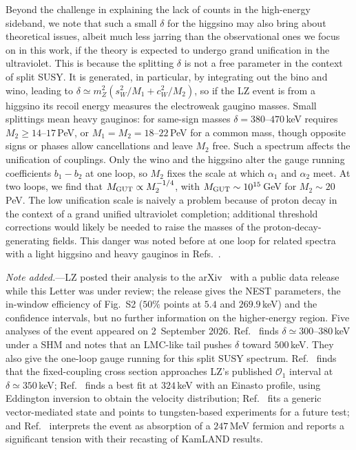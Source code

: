 \documentclass[reprint,superscriptaddress,preprintnumbers,amsmath,amssymb,aps,prd,tightenlines,longbibliography,nofootinbib]{revtex4-2}
\begin{document}
Beyond the challenge in explaining the lack of counts in the high-energy sideband, we note that such a small $\delta$ for the higgsino may also bring about theoretical issues, albeit much less jarring than the observational ones we focus on in this work, if the theory is expected to undergo grand unification in the ultraviolet. This is because the splitting $\delta$ is not a free parameter in the context of split SUSY. It is generated, in particular, by integrating out the bino and wino, leading to $\delta\simeq m_Z^2(s_W^2/M_1+c_W^2/M_2)$, so if the LZ event is from a higgsino its recoil energy measures the electroweak gaugino masses. Small splittings mean heavy gauginos: for same-sign masses $\delta=380$--$470$\,keV requires $M_2\geq14$--$17$\,PeV, or $M_1=M_2=18$--$22$\,PeV for a common mass, though opposite signs or phases allow cancellations and leave $M_2$ free. Such a spectrum affects the unification of couplings. Only the wino and the higgsino alter the gauge running coefficients $b_1-b_2$ at one loop, so $M_2$ fixes the scale at which $\alpha_1$ and $\alpha_2$ meet. At two loops, we find that $M_{\rm GUT} \propto M_2^{-1/4}$, with $M_{\rm GUT} \sim 10^{15}$\,GeV for $M_2 \sim 20$\,PeV.
The low unification scale is naively a problem because of proton decay in the context of a grand unified ultraviolet completion; additional threshold corrections would likely be needed to raise the masses of the proton-decay-generating fields. 
This danger was noted before at one loop for related spectra with a light
higgsino and heavy gauginos in Refs.~\cite{Cheung:2005ba,Jeong:2017rrs}. 


\emph{Note added.}---LZ posted their analysis to the
arXiv~\cite{LZ:2026axp}  with a public data release while this Letter was
under review; the release gives the NEST parameters, the in-window
efficiency of Fig.~S2 ($50\%$ points at $5.4$ and $269.9$\,keV) and the
confidence intervals, but no further information on the higher-energy region.
Five analyses of the
event appeared on 2~September 2026. Ref.~\cite{Fan:2026higgsino} finds
$\delta\simeq300$--$380$\,keV under a SHM and notes that
an LMC-like tail pushes $\delta$ toward $500$\,keV.  They also  give the one-loop gauge running for this split SUSY spectrum.
Ref.~\cite{Freese:2026higgsino} finds that the fixed-coupling cross
section approaches LZ's published $\mathcal{O}_1$ interval at
$\delta\simeq350$\,keV; Ref.~\cite{Wu:2026higgsino} finds a best fit at
$324$\,keV with an Einasto profile, using Eddington inversion to obtain the velocity distribution;
Ref.~\cite{Su:2026inelastic} fits a generic vector-mediated state and
points to tungsten-based experiments for a future test; and Ref.~\cite{Lou:2026absorption} interprets the
event as absorption of a $247$\,MeV fermion and reports a significant
tension with their  recasting of KamLAND results. 
\end{document}
